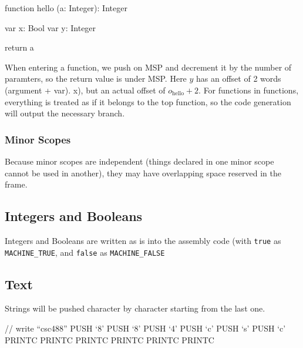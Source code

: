   \begin{code}
  function hello (a: Integer): Integer
  {
    var x: Bool
    var y: Integer
   
    return a
  }
  \end{code}
  When entering a function, we push on MSP and decrement it by the number of
  paramters, so the return value is under MSP.
  Here $y$ has an offset of 2 words (argument + var).
  x), but an actual offset of $o_{\text{hello}} + 2$.
  For functions in functions, everything is treated as if it belongs to the top
  function, so the code generation will output the necessary branch.
\subsubsection{Minor Scopes}
  Because minor scopes are independent (things declared in one minor scope
  cannot be used in another), they may have overlapping space reserved in the
  frame.
\subsection{Integers and Booleans}
  Integers and Booleans are written as is into the assembly code (with
  \texttt{true} as \texttt{MACHINE\_TRUE}, and \texttt{false} as
  \texttt{MACHINE\_FALSE}
\subsection{Text}
  Strings will be pushed character by character starting from the last one.
  \begin{code}[Text]
    // write ``csc488''
    PUSH `8'
    PUSH `8'
    PUSH `4'
    PUSH `c'
    PUSH `s'
    PUSH `c'
    PRINTC
    PRINTC
    PRINTC
    PRINTC
    PRINTC
    PRINTC
  \end{code}
